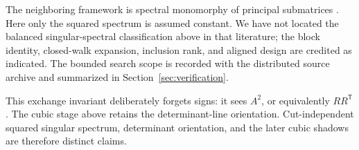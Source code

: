 The neighboring framework is spectral monomorphy of principal submatrices
\cite{AttasSpectralMonomorphy,BoussairiTwoGraphs}.  Here only the squared
spectrum is assumed constant.  We have not located the balanced
singular-spectral classification above in that literature; the block identity,
closed-walk expansion, inclusion rank, and aligned design are credited as
indicated.  The bounded search scope is recorded with the distributed source
archive and summarized in Section~\ref{sec:verification}.

This exchange invariant deliberately forgets signs: it sees \(A^2\), or
equivalently \(RR^{\mathsf T}\).  The cubic stage above retains the
determinant-line orientation.  Cut-independent squared singular spectrum,
determinant orientation, and the later cubic shadows are therefore distinct
claims.
